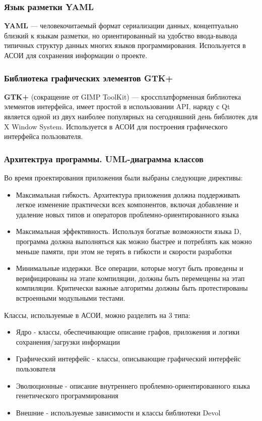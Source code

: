 \documentclass[russian,utf8,emptystyle]{eskdtext}
\begin{document}
\begin{spacing}{1.5}
\subsubsection{Язык разметки YAML}
\textbf{YAML} — человекочитаемый формат сериализации данных, концептуально близкий к языкам разметки, но ориентированный на удобство ввода-вывода типичных структур данных многих языков программирования. Используется в АСОИ для сохранения информации о проекте.

\subsubsection{Библиотека графических элементов GTK+}
\textbf{GTK+} (сокращение от GIMP ToolKit) — кроссплатформенная библиотека элементов интерфейса, имеет простой в использовании API, наряду с Qt является одной из двух наиболее популярных на сегодняшний день библиотек для X Window System. Используется в АСОИ для построения графического интерфейса пользователя.

\subsubsection{Архитектруа программы. UML-диаграмма классов}
Во время проектирования приложения были выбраны следующие директивы:
\begin{itemize}
\item Максимальная гибкость. Архитектура приложения должна поддерживать легкое изменение практически всех компонентов, включая добавление и удаление новых типов и операторов проблемно-ориентированного языка
\item Максимальная эффективность. Используя богатые возможности языка D, программа должна выполняться как можно быстрее и потреблять как можно меньше памяти, при этом не терять в гибкости и скорости разработки
\item Минимальные издержки. Все операции, которые могут быть проведены и верифицированы на этапе компиляции, должны быть перемещены на этап компиляции. Критически важные алгоритмы должны быть протестированы встроенными модульными тестами.
\end{itemize}

Классы, используемые в АСОИ, можно разделить на 3 типа:
\begin{itemize}
\item Ядро - классы, обеспечивающие описание графов, приложения и логики сохранения/загрузки информации
\item Графический интерфейс - классы, описывающие графический интерфейс пользователя
\item Эволюционные - описание внутреннего проблемно-ориентированного языка генетического программирования
\item Внешние - используемые зависимости и классы библиотеки Devol
\end{itemize}


\end{spacing}
\end{document}
